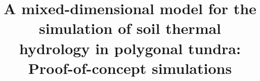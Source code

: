 \documentclass[review]{elsarticle}
\begin{document}
\begin{frontmatter}

\title{A mixed-dimensional model for the simulation of soil thermal hydrology in polygonal tundra: Proof-of-concept simulations}





\begin{abstract}


\end{abstract}
\end{frontmatter}
\end{document}
